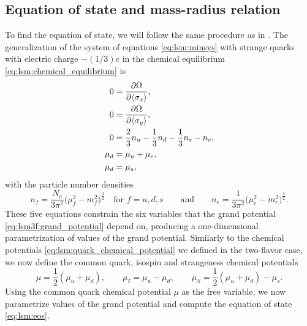 

\subsection{Equation of state and mass-radius relation}

To find the equation of state,
we will follow the same procedure as in .
The generalization of the system of equations \eqref{eq:lsm:minsys} with strange quarks with electric charge $-(1/3)e$ in the chemical equilibrium \eqref{eq:lsm:chemical_equilibrium} is
\begin{subequations}
\begin{align}
	0 &= \pdv{\Omega}{ \langle \sigma_x \rangle}, \\
	0 &= \pdv{\Omega}{ \langle \sigma_y \rangle}, \\
	0 &= \frac23 n_u - \frac13 n_d - \frac13 n_s - n_e, \\
	\mu_d &= \mu_u + \mu_e, \\
	\mu_d &= \mu_s,
\end{align}%
\label{eq:lsm3f:minsys}%
\end{subequations}%
with the particle number densities
\begin{equation}
	n_f = \frac{N_c}{3\pi^2} \Big(\mu_f^2 - m_f^2\Big)^{\frac32} \quad \text{for $f = u,d,s$}
	\qquad \text{and} \qquad
	n_e = \frac{  1}{3\pi^2} \Big(\mu_e^2 - m_e^2\Big)^{\frac32}.
\label{eq:lsm3f:particle_densities}
\end{equation}
These five equations constrain the six variables that the grand potential \eqref{eq:lsm3f:grand_potential} depend on,
producing a one-dimensional parametrization of values of the grand potential.
Similarly to the chemical potentials \eqref{eq:lsm:quark_chemical_potential} we defined in the two-flavor case,
we now define the common quark, isospin and strangeness chemical potentials
\begin{equation}
	\mu = \frac12 (\mu_u + \mu_d), \qquad
	\mu_I = \mu_u - \mu_d, \qquad
	\mu_S = \frac12 (\mu_u + \mu_d) - \mu_s.
\end{equation}
Using the common quark chemical potential $\mu$ as the free variable,
we now parametrize values of the grand potential and compute the equation of state \eqref{eq:lsm:eos}.
